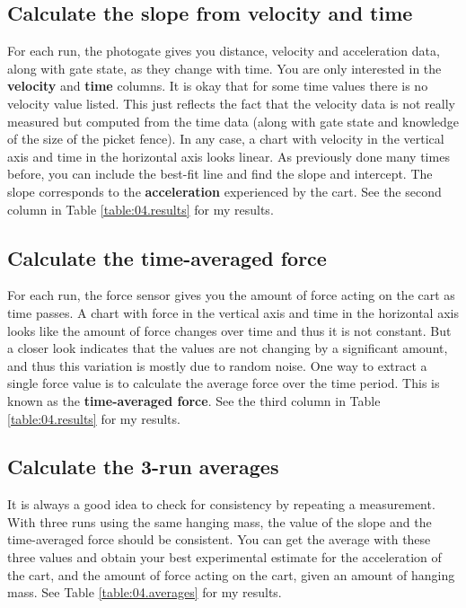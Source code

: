 \subsection{Calculate the slope from velocity and time}
%
For each run, the photogate gives you distance, velocity and acceleration data, along with gate state, as they change with time. You are only interested in the \textbf{velocity} and \textbf{time} columns. It is okay that for some time values there is no velocity value listed. This just reflects the fact that the velocity data is not really measured but computed from the time data (along with gate state and knowledge of the size of the picket fence). In any case, a chart with velocity in the vertical axis and time in the horizontal axis looks linear. As previously done many times before, you can include the best-fit line and find the slope and intercept. The slope corresponds to the \textbf{acceleration} experienced by the cart. See the second column in Table \ref{table:04.results} for my results.
%
\subsection{Calculate the time-averaged force}
%
For each run, the force sensor gives you the amount of force acting on the cart as time passes. A chart with force in the vertical axis and time in the horizontal axis looks like the amount of force changes over time and thus it is not constant. But a closer look indicates that the values are not changing by a significant amount, and thus this variation is mostly due to random noise. One way to extract a single force value is to calculate the average force over the time period. This is known as the \textbf{time-averaged force}. See the third column in Table \ref{table:04.results} for my results.
%
\subsection{Calculate the 3-run averages}
%
It is always a good idea to check for consistency by repeating a measurement. With three runs using the same hanging mass, the value of the slope and the time-averaged force should be consistent. You can get the average with these three values and obtain your best experimental estimate for the acceleration of the cart, and the amount of force acting on the cart, given an amount of hanging mass. See Table \ref{table:04.averages} for my results.
%
